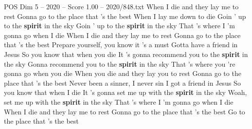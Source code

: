 \begin{textsample}{POS Dim 5 – 2020 – Score 1.00 – 2020/848.txt}  \label{ex:f5_pos_029}
When I die and they lay me to rest Gonna go to the place that 's the best When I lay me down to die Goin ' up to the \textbf{spirit} in the sky Goin ' up to the \textbf{spirit} in the sky That 's where I 'm gonna go when I die When I die and they lay me to rest Gonna go to the place that 's the best Prepare yourself, you know it 's a must Gotta have a friend in Jesus So you know that when you die It 's gonna recommend you to the \textbf{spirit} in the sky Gonna recommend you to the \textbf{spirit} in the sky That 's where you 're gonna go when you die When you die and they lay you to rest Gonna go to the place that 's the best Never been a sinner, I never sin I got a friend in Jesus So you know that when I die It 's gonna set me up with the \textbf{spirit} in the sky Woah, set me up with the \textbf{spirit} in the sky That 's where I 'm gonna go when I die When I die and they lay me to rest Gonna go to the place that 's the best Go to the place that 's the best

\end{textsample}
